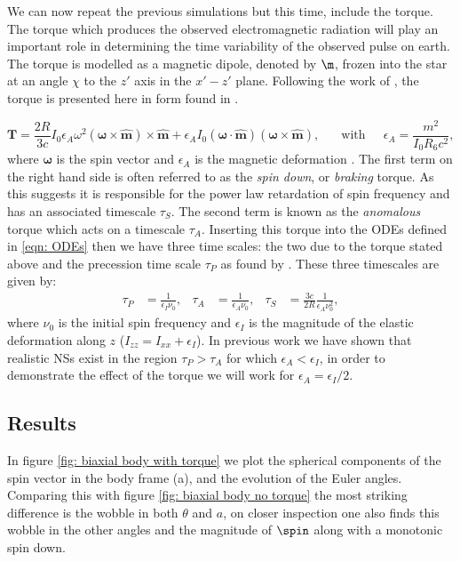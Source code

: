 \documentclass[/home/greg/Thesis/main/main.tex]{subfiles}
\begin{document}
We can now repeat the previous simulations but this time, include the torque.
The torque which produces the observed electromagnetic radiation will play an
important role in determining the time variability of the observed pulse on
earth. The torque is modelled as a magnetic dipole, denoted by $\m$, frozen
into the star at an angle $\chi$ to the $z'$ axis in the $x'-z'$ plane.
Following the work of \citet{Deutsch1955}, the torque is presented here in form
found in \citet{Goldreich1970}.

\begin{equation}
\boldsymbol{T}=\frac{2R}{3c} I_{0}\epsilon_{A}\omega^{2}(\boldsymbol{\omega} \times \hat{\boldsymbol{m}})\times \hat{\boldsymbol{m}} + \epsilon_{A}I_{0}(\boldsymbol{\omega} \cdot \hat{\boldsymbol{m}})(\boldsymbol{\omega} \times \hat{\boldsymbol{m}}), \;\;\;\;\; \textrm{ with } \;\;\;\; \epsilon_{A} = \frac{m^{2}}{I_{0}R_{6}c^{2}},
\label{eqn: torque}
\end{equation}
where $\boldsymbol{\omega}$ is the spin vector and $\epsilon_{A}$ is the magnetic deformation \citep[see][]{Glampedakis2010}.
The first term on the right hand side is often referred to as the \emph{spin down}, or \emph{braking} torque. As this suggests it is responsible for the power law retardation of spin frequency and has an associated timescale $\tau_{S}$. The second term is known as the \emph{anomalous} torque which acts on a timescale $\tau_{A}$. Inserting this torque into the ODEs defined in \eqref{eqn: ODEs} then we have three time scales: the two due to the torque stated above and the precession time scale $\tau_{P}$ as found by \citet{Jones2001}. These three timescales are given by:
\begin{align}
\tau_{P} &= \frac{1}{\epsilon_{I}\nu_{0}}, & \tau_{A}&=\frac{1}{\epsilon_{A}\nu_{0}}, & \tau_{S}&=\frac{3c}{2R}\frac{1}{\epsilon_{A}\nu_{0}^{2}},
\label{eqn: timescales}
\end{align} 
where $\nu_{0}$ is the initial spin frequency and $\epsilon_{I}$ is the magnitude of the elastic deformation along $z$ ($I_{zz} = I_{xx} + \epsilon_{I}$). In previous work we have shown %
that realistic NSs exist in the region $\tau_{P} > \tau_{A}$ for which $\epsilon_{A} < \epsilon_{I}$, in order to demonstrate the effect of the torque we will work for $\epsilon_{A} = \epsilon_{I}/2$. 
\subsection{Results}
In figure \ref{fig: biaxial body with torque} we plot the spherical components of the spin vector in the body frame (a), and the evolution of the Euler angles. Comparing this with figure \ref{fig: biaxial body no torque} the most striking difference is the wobble in both $\theta$ and $a$, on closer inspection one also finds this wobble in the other angles and the magnitude of $\spin$ along with a monotonic spin down.
\end{document}
